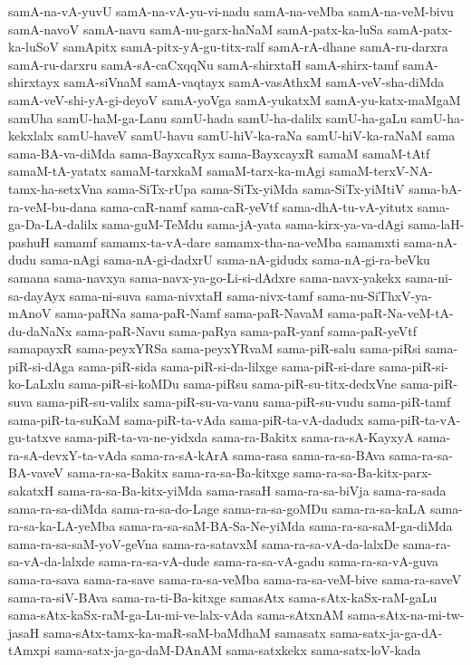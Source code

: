 {samA-na-vA-yuvU
samA-na-vA-yu-vi-nadu
samA-na-veMba
samA-na-veM-bivu
samA-navoV
samA-navu
samA-nu-garx-haNaM
samA-patx-ka-luSa
samA-patx-ka-luSoV
samApitx
samA-pitx-yA-gu-titx-ralf
samA-rA-dhane
samA-ru-darxra
samA-ru-darxru
samA-sA-caCxqqNu
samA-shirxtaH
samA-shirx-tamf
samA-shirxtayx
samA-siVnaM
samA-vaqtayx
samA-vasAthxM
samA-veV-sha-diMda
samA-veV-shi-yA-gi-deyoV
samA-yoVga
samA-yukatxM
samA-yu-katx-maMgaM
samUha
samU-haM-ga-Lanu
samU-hada
samU-ha-dalilx
samU-ha-gaLu
samU-ha-kekxlalx
samU-haveV
samU-havu
samU-hiV-ka-raNa
samU-hiV-ka-raNaM
sama
sama-BA-va-diMda
sama-BayxcaRyx
sama-BayxcayxR
samaM
samaM-tAtf
samaM-tA-yatatx
samaM-tarxkaM
samaM-tarx-ka-mAgi
samaM-terxV-NA-tamx-ha-setxVna
sama-SiTx-rUpa
sama-SiTx-yiMda
sama-SiTx-yiMtiV
sama-bA-ra-veM-bu-dana
sama-caR-namf
sama-caR-yeVtf
sama-dhA-tu-vA-yitutx
sama-ga-Da-LA-dalilx
sama-guM-TeMdu
sama-jA-yata
sama-kirx-ya-va-dAgi
sama-laH-pashuH
samamf
samamx-ta-vA-dare
samamx-tha-na-veMba
samamxti
sama-nA-dudu
sama-nAgi
sama-nA-gi-dadxrU
sama-nA-gidudx
sama-nA-gi-ra-beVku
samana
sama-navxya
sama-navx-ya-go-Li-si-dAdxre
sama-navx-yakekx
sama-ni-sa-dayAyx
sama-ni-suva
sama-nivxtaH
sama-nivx-tamf
sama-nu-SiThxV-ya-mAnoV
sama-paRNa
sama-paR-Namf
sama-paR-NavaM
sama-paR-Na-veM-tA-du-daNaNx
sama-paR-Navu
sama-paRya
sama-paR-yanf
sama-paR-yeVtf
samapayxR
sama-peyxYRSa
sama-peyxYRvaM
sama-piR-salu
sama-piRsi
sama-piR-si-dAga
sama-piR-sida
sama-piR-si-da-lilxge
sama-piR-si-dare
sama-piR-si-ko-LaLxlu
sama-piR-si-koMDu
sama-piRsu
sama-piR-su-titx-dedxVne
sama-piR-suva
sama-piR-su-valilx
sama-piR-su-va-vanu
sama-piR-su-vudu
sama-piR-tamf
sama-piR-ta-suKaM
sama-piR-ta-vAda
sama-piR-ta-vA-dadudx
sama-piR-ta-vA-gu-tatxve
sama-piR-ta-va-ne-yidxda
sama-ra-Bakitx
sama-ra-sA-KayxyA
sama-ra-sA-devxY-ta-vAda
sama-ra-sA-kArA
sama-rasa
sama-ra-sa-BAva
sama-ra-sa-BA-vaveV
sama-ra-sa-Bakitx
sama-ra-sa-Ba-kitxge
sama-ra-sa-Ba-kitx-parx-sakatxH
sama-ra-sa-Ba-kitx-yiMda
sama-rasaH
sama-ra-sa-biVja
sama-ra-sada
sama-ra-sa-diMda
sama-ra-sa-do-Lage
sama-ra-sa-goMDu
sama-ra-sa-kaLA
sama-ra-sa-ka-LA-yeMba
sama-ra-sa-saM-BA-Sa-Ne-yiMda
sama-ra-sa-saM-ga-diMda
sama-ra-sa-saM-yoV-geVna
sama-ra-satavxM
sama-ra-sa-vA-da-lalxDe
sama-ra-sa-vA-da-lalxde
sama-ra-sa-vA-dude
sama-ra-sa-vA-gadu
sama-ra-sa-vA-guva
sama-ra-sava
sama-ra-save
sama-ra-sa-veMba
sama-ra-sa-veM-bive
sama-ra-saveV
sama-ra-siV-BAva
sama-ra-ti-Ba-kitxge
samasAtx
sama-sAtx-kaSx-raM-gaLu
sama-sAtx-kaSx-raM-ga-Lu-mi-ve-lalx-vAda
sama-sAtxnAM
sama-sAtx-na-mi-tw-jasaH
sama-sAtx-tamx-ka-maR-saM-baMdhaM
samasatx
sama-satx-ja-ga-dA-tAmxpi
sama-satx-ja-ga-daM-DAnAM
sama-satxkekx
sama-satx-loV-kada
}
